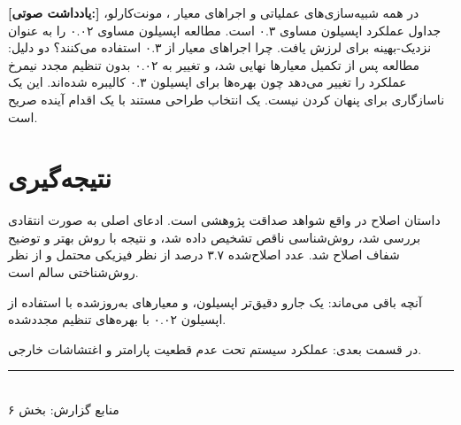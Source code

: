 \documentclass[12pt, a4paper]{article}
\newcommand{\dash}{\lr{---}}
\begin{document}
\begin{mdframed}[
  backgroundcolor=audiotan,
  linecolor=audionote!70,
  linewidth=1pt,
  innerleftmargin=12pt,
  innerrightmargin=12pt,
  innertopmargin=8pt,
  innerbottommargin=8pt
]
\textbf{\color{audionote}[يادداشت صوتی:]}
در همه شبيه‌سازی‌های عملياتی و اجراهای معيار \dash{} ، مونت‌کارلو، جداول عملکرد \dash{} اپسيلون مساوی ۰.۳ است. مطالعه  اپسيلون مساوی ۰.۰۲ را به عنوان نزديک-بهينه برای لرزش يافت. چرا اجراهای معيار از ۰.۳ استفاده می‌کنند؟ دو دليل: مطالعه  پس از تکميل معيارها نهايی شد، و تغيير به ۰.۰۲ بدون تنظيم مجدد  نيمرخ عملکرد را تغيير می‌دهد چون بهره‌ها برای اپسيلون ۰.۳ کاليبره شده‌اند. اين يک ناسازگاری برای پنهان کردن نيست. يک انتخاب طراحی مستند با يک اقدام آينده صريح است.
\end{mdframed}

\vspace{0.6cm}

\section{نتيجه‌گيری}

داستان اصلاح  در واقع شواهد صداقت پژوهشی است. ادعای اصلی به صورت انتقادی بررسی شد، روش‌شناسی ناقص تشخيص داده شد، و نتيجه با روش بهتر و توضيح شفاف اصلاح شد. عدد اصلاح‌شده ۳.۷ درصد از نظر فيزيکی محتمل و از نظر روش‌شناختی سالم است.

آنچه باقی می‌ماند: يک جارو دقيق‌تر اپسيلون، و معيارهای به‌روزشده با استفاده از اپسيلون ۰.۰۲ با بهره‌های تنظيم مجدد‌شده.

در قسمت بعدی: عملکرد سيستم تحت عدم قطعيت پارامتر و اغتشاشات خارجی.

\vspace{1.5cm}
\begin{center}
{\color{seriesblue}\rule{0.45\linewidth}{0.4pt}}\\[8pt]
{\small\color{sectiongray}
منابع گزارش: بخش ۶
}
\end{center}
\end{document}
